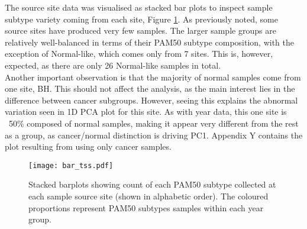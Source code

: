     The source site data was visualised as stacked bar plots to inspect sample subtype variety coming from each site, Figure \ref{fig:bartss}. As previously noted, some source sites have produced very few samples. The larger sample groups are relatively well-balanced in terms of their PAM50 subtype composition, with the exception of Normal-like, which comes only from 7 sites. This is, however, expected, as there are only 26 Normal-like samples in total. \\
    
    Another important observation is that the majority of normal samples come from one site, BH. This should not affect the analysis, as the main interest lies in the difference between cancer subgroups. However, seeing this explains the abnormal variation seen in 1D PCA plot for this site. As with year data, this one site is ~50\% composed of normal samples, making it appear very different from the rest as a group, as cancer/normal distinction is driving PC1. Appendix Y contains the plot resulting from using only cancer samples. 
  
    \newpage
    
            \begin{figure}[!h]
            \centering
            \texttt{[image: bar\_tss.pdf]}
            \caption[Stacked barplots of sample counts per year]{Stacked barplots showing count of each PAM50 subtype collected at each sample source site (shown in alphabetic order). The coloured proportions represent PAM50 subtypes samples within each year group. }
            \label{fig:bartss}
            \end{figure}
    
    
    
    


